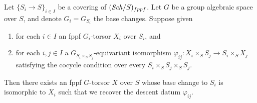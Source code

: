 \begin{lemma}
\label{lemma-descent-torsor}
Let $\{S_i \to S\}_{i \in I}$ be a covering of $(\mathit{Sch}/S)_{fppf}$.
Let $G$ be a group algebraic space over $S$, and denote
$G_i = G_{S_i}$ the base changes. Suppose given
\begin{enumerate}
\item for each $i \in I$ an fppf $G_i$-torsor $X_i$ over $S_i$,
and
\item for each $i, j \in I$ a $G_{S_i \times_S S_j}$-equivariant isomorphism
$\varphi_{ij} : X_i \times_S S_j \to S_i \times_S X_j$ satisfying the cocycle
condition over every $S_i \times_S S_j \times_S S_j$.
\end{enumerate}
Then there exists an fppf $G$-torsor $X$ over $S$
whose base change to $S_i$ is isomorphic to $X_i$ such that we
recover the descent datum $\varphi_{ij}$.
\end{lemma}

